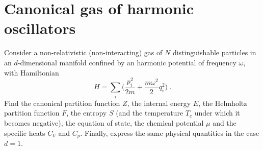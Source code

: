 \section{Canonical gas of harmonic oscillators}

    \begin{exercise}
        Consider a non-relativistic (non-interacting) gas of $N$ distinguishable particles in an $d$-dimensional manifold confined by an harmonic potential of frequency $\omega$, with Hamiltonian 
        \begin{equation*}
            H = \sum_i \Big ( \frac{p^2_i}{2m} + \frac{m \omega^2}{2} q_i^2 \Big ) ~.
        \end{equation*}
        Find the canonical partition function $Z$, the internal energy $E$, the Helmholtz partition function $F$, the entropy $S$ (and the temperature $T_c$ under which it becomes negative), the equation of state, the chemical potential $\mu$ and the specific heats $C_V$ and $C_p$. Finally, express the same physical quantities in the case $d = 1$.
    \end{exercise}

